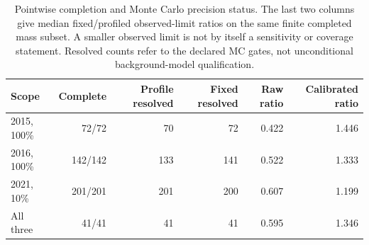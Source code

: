 \begin{table}[H]\centering\small
\begin{tabular}{lrrrrr}\toprule
Scope & Complete & Profile resolved & Fixed resolved & Raw ratio & Calibrated ratio\\\midrule
2015, 100\% & 72/72 & 70 & 72 & 0.422 & 1.446\\
2016, 100\% & 142/142 & 133 & 141 & 0.522 & 1.333\\
2021, 10\% & 201/201 & 201 & 200 & 0.607 & 1.199\\
All three & 41/41 & 41 & 41 & 0.595 & 1.346\\
\bottomrule\end{tabular}
\caption{Pointwise completion and Monte Carlo precision status. The last two columns give median fixed/profiled observed-limit ratios on the same finite completed mass subset. A smaller observed limit is not by itself a sensitivity or coverage statement. Resolved counts refer to the declared MC gates, not unconditional background-model qualification.}
\label{tab:calibration_summary}\end{table}
